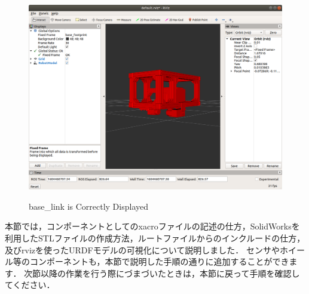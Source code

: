 \documentclass[{../../master}]{subfiles}
\begin{document}
\begin{figure}[ht]
  \centering
  \includegraphics[width=100truemm]{images/rviz_robot_model_successfully_viewed.png}
  \label{fig:rviz_robot_model_subccessfully_viewed}
  \caption{\textsf{base\_link} is Correctly Displayed}
\end{figure}

本節では，コンポーネントとしてのxacroファイルの記述の仕方，SolidWorksを利用したSTLファイルの作成方法，ルートファイルからのインクルードの仕方，及び\textsf{rviz}を使ったURDFモデルの可視化について説明しました．
センサやホイール等のコンポーネントも，本節で説明した手順の通りに追加することができます．
次節以降の作業を行う際にづまづいたときは，本節に戻って手順を確認してください．
\end{document}
